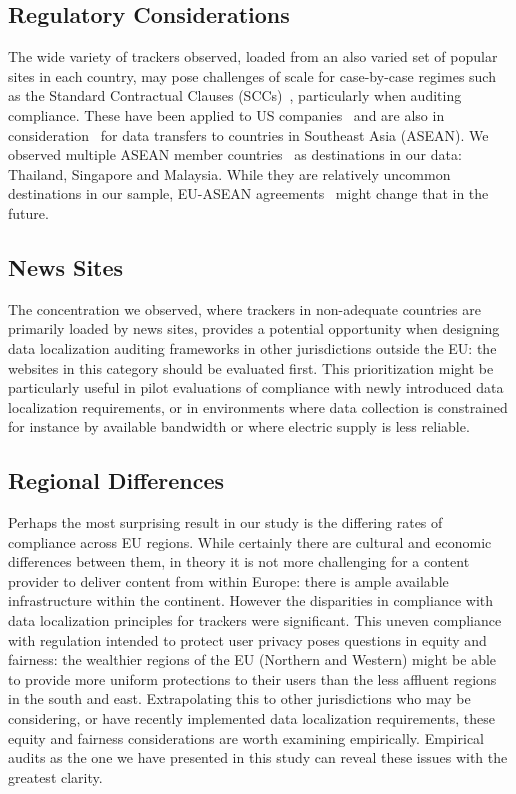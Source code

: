\subsection{Regulatory Considerations}
The wide variety of trackers observed, loaded from an also varied
set of popular sites in each country, may pose challenges of scale for case-by-case regimes
such as the Standard Contractual Clauses (SCCs)~\cite{sccs},
particularly when auditing compliance. 
These have been applied to US companies~\cite{leglobal}
and are also in consideration~\cite{sccs} for data transfers to countries in 
Southeast Asia (ASEAN). We observed multiple ASEAN member countries~\cite{asean}
as destinations in our data: Thailand, Singapore and Malaysia. While
they are relatively uncommon destinations in our sample, EU-ASEAN
agreements~\cite{sccs} might change that in the future.

\subsection{News Sites}
The concentration we observed, where trackers in non-adequate countries
are primarily loaded by news sites, provides a potential opportunity
when designing data localization auditing frameworks in other jurisdictions
outside the EU: the websites in this
category should be evaluated first. This prioritization might 
be particularly useful in pilot evaluations of compliance with newly introduced
data localization requirements, or in environments where data collection is constrained
for instance by available bandwidth or where electric supply is less reliable.

\subsection{Regional Differences}
Perhaps the most surprising result in our study is the
differing rates of compliance across EU regions. While
certainly there are cultural and economic differences between
them, in theory it is not more challenging for a content provider
to deliver content from within Europe: there is ample available infrastructure
within the continent. However the disparities in 
compliance with data localization principles for trackers were significant. 
This uneven compliance with regulation intended to 
protect user privacy poses questions in equity and fairness:
the wealthier regions of the EU (Northern and Western) might 
be able to provide more uniform protections to their users than the 
less affluent regions in the south and east. Extrapolating this to
other jurisdictions who may be considering, or have recently implemented
data localization requirements, these equity and fairness considerations
are worth examining empirically. Empirical audits as the one we have presented in 
this study can reveal these issues 
with the greatest clarity.

